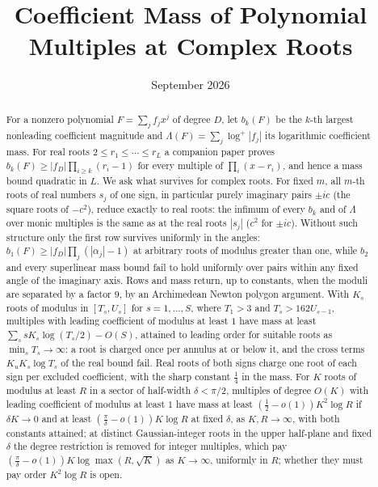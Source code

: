 \documentclass[11pt]{article}
\title{Coefficient Mass of Polynomial Multiples at Complex Roots}
\author{\shortstack{Bangyen Pham\\
\small Independent Researcher\\
\small\href{mailto:bangyenp@gmail.com}{\texttt{bangyenp@gmail.com}}\\
\small\href{https://orcid.org/0009-0006-9928-2088}{ORCID: 0009-0006-9928-2088}}}
\date{September 2026}
\begin{document}
\maketitle

\begin{abstract}
For a nonzero polynomial $F=\sum_jf_jx^j$ of degree $D$, let $b_k(F)$ be the
$k$-th largest nonleading coefficient magnitude and
$\Lambda(F)=\sum_j\log^+|f_j|$ its logarithmic coefficient mass.  For real
roots $2\le r_1\le\cdots\le r_L$ a companion paper proves
$b_k(F)\ge|f_D|\prod_{i\ge k}(r_i-1)$ for every multiple of
$\prod_i(x-r_i)$, and hence a mass bound quadratic in $L$.  We ask what
survives for complex roots.  For fixed $m$, all $m$-th roots of real
numbers $s_j$ of one sign, in particular purely imaginary pairs $\pm ic$
(the square roots of $-c^2$), reduce exactly to real roots: the infimum of
every $b_k$ and of $\Lambda$ over monic multiples is the same as at the real
roots $|s_j|$ ($c^2$ for $\pm ic$).  Without such structure only the
first row survives uniformly in the angles: $b_1(F)\ge|f_D|\prod_j(|\alpha_j|-1)$ at arbitrary roots
of modulus greater than one, while $b_2$ and every superlinear mass bound
fail to hold uniformly over pairs within any fixed angle of the imaginary axis.  Rows and mass
return, up to constants, when the moduli are separated by a factor $9$, by
an Archimedean Newton polygon argument.  With $K_s$ roots of modulus in
$[T_s,U_s]$ for $s=1,\ldots,S$, where $T_1>3$ and $T_s>162U_{s-1}$,
multiples with leading coefficient of modulus at least $1$ have mass at least
$\sum_ssK_s\log(T_s/2)-O(S)$,
attained to leading order for suitable roots as $\min_sT_s\to\infty$: a root is charged once per annulus at or below it, and the
cross terms $K_uK_s\log T_s$ of the real bound fail.  Real roots of both
signs charge one
root of each sign per excluded coefficient, with the sharp constant
$\frac14$ in the mass.  For $K$ roots of modulus at least $R$ in a sector of
half-width $\delta<\pi/2$, multiples of degree $O(K)$ with leading
coefficient of modulus at least $1$ have mass at least
$(\frac12-o(1))K^2\log R$ if $\delta K\to0$ and at least $(\frac\pi\delta-o(1))K\log R$
at fixed $\delta$, as $K,R\to\infty$, with both constants attained; at
distinct Gaussian-integer roots in the upper half-plane and fixed $\delta$ the degree restriction is removed
for integer multiples, which pay $(\frac\pi\delta-o(1))K\log\max(R,\sqrt K)$
as $K\to\infty$, uniformly in $R$; whether they must pay order $K^2\log R$ is
open.
\end{abstract}
\end{document}
